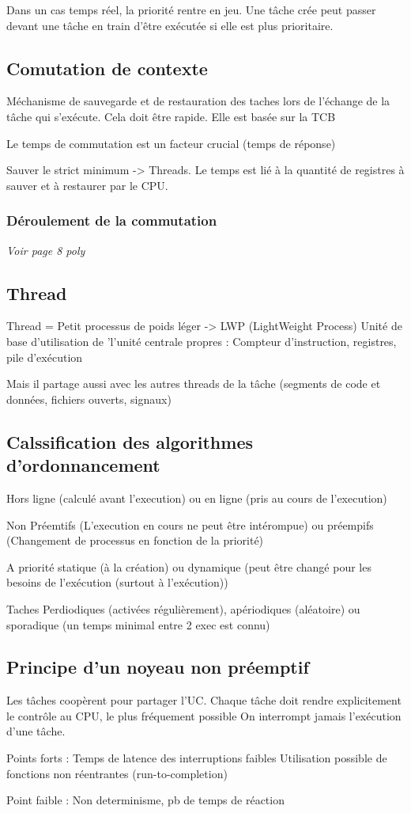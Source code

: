 \documentclass[11pt]{article}
\begin{document}
	Dans un cas temps réel, la priorité rentre en jeu. Une tâche crée peut passer devant une tâche en train d'être exécutée si elle est plus prioritaire.
	
	\subsection{Comutation de contexte}
	
	Méchanisme de sauvegarde et de restauration des taches lors de l'échange de la tâche qui s'exécute. Cela doit être rapide. Elle est basée sur la TCB
	
	Le temps de commutation est un facteur crucial (temps de réponse)
	
	Sauver le strict minimum -> Threads. Le temps est lié à la quantité de registres à sauver et à restaurer par le CPU.
	
	\subsubsection{Déroulement de la commutation}
	\emph{Voir page 8 poly}
	
	\subsection{Thread}
	Thread = Petit processus de poids léger -> LWP (LightWeight Process)
	Unité de base d'utilisation de 'l'unité centrale propres :
	Compteur d'instruction, registres, pile d'exécution
	
	Mais il partage aussi avec les autres threads de la tâche (segments de code et données, fichiers ouverts, signaux)
	
	\subsection{Calssification des algorithmes d'ordonnancement}
	Hors ligne (calculé avant l'execution) ou en ligne (pris au cours de l'execution)
	
	Non Préemtifs (L'execution en cours ne peut être intérompue) ou préempifs (Changement de processus en fonction de la priorité)
	
	A priorité statique (à la création) ou dynamique (peut être changé pour les besoins de l'exécution (surtout à l'exécution))
	
	Taches Perdiodiques (activées régulièrement), apériodiques (aléatoire) ou sporadique (un temps minimal entre 2 exec est connu)
	
	\subsection{Principe d'un noyeau non préemptif}
	
	Les tâches coopèrent pour partager l'UC. 
	Chaque tâche doit rendre explicitement le contrôle au CPU, le plus fréquement possible
	On interrompt jamais l'exécution d'une tâche.
	
	Points forts : Temps de latence des interruptions faibles
	Utilisation possible de fonctions non réentrantes (run-to-completion)
	
	Point faible : Non determinisme, pb de temps de réaction
	
\end{document}
